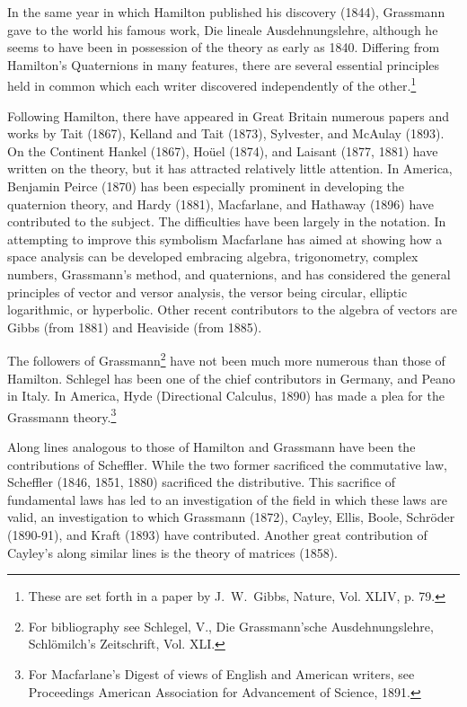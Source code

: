 \documentclass[oneside]{book}
\begin{document}
In the same year in which Hamilton published his discovery (1844),
Grassmann gave to the world his famous work, Die lineale
Ausdehnungslehre, although he seems to have been in possession of
the theory as early as 1840. Differing from Hamilton's Quaternions
in many features, there are several essential principles held in
common which each writer discovered independently of the
other.\footnote{These are set forth in a paper by J.~W.~Gibbs,
Nature, Vol. XLIV, p. 79.}

Following Hamilton, there have appeared in Great Britain numerous
papers and works by Tait (1867), Kelland and Tait (1873), Sylvester,
and McAulay (1893). On the Continent Hankel (1867), Ho\"uel (1874),
and Laisant (1877, 1881) have written on the theory, but it has
attracted relatively little attention. In America, Benjamin Peirce
(1870) has been especially prominent in developing the quaternion
theory, and Hardy (1881), Macfarlane, and Hathaway (1896) have
contributed to the subject. The difficulties have been largely in
the notation. In attempting to improve this symbolism Macfarlane has
aimed at showing how a space analysis can be developed embracing
algebra, trigonometry, complex numbers, Grassmann's method, and
quaternions, and has considered the general principles of vector and
versor analysis, the versor being circular, elliptic logarithmic, or
hyperbolic. Other recent contributors to the algebra of vectors are
Gibbs (from 1881) and Heaviside (from 1885).

The followers of Grassmann\footnote{For bibliography see Schlegel,
V., Die Grassmann'sche Ausdehnungslehre, Schl\"omilch's Zeitschrift,
Vol. XLI.} have not been much more numerous than those of
Hamilton. Schlegel has been one of the chief contributors in
Germany, and Peano in Italy. In America, Hyde (Directional Calculus,
1890) has made a plea for the Grassmann theory.\footnote{For
Macfarlane's Digest of views of English and American writers, see
Proceedings American Association for Advancement of Science, 1891.}

Along lines analogous to those of Hamilton and Grassmann have been
the contributions of Scheffler. While the two former sacrificed the
commutative law, Scheffler (1846, 1851, 1880) sacrificed the
distributive. This sacrifice of fundamental laws has led to an
investigation of the field in which these laws are valid, an
investigation to which Grassmann (1872), Cayley, Ellis, Boole,
Schr\"oder (1890-91), and Kraft (1893) have contributed. Another
great contribution of Cayley's along similar lines is the theory of
matrices (1858).
\end{document}
